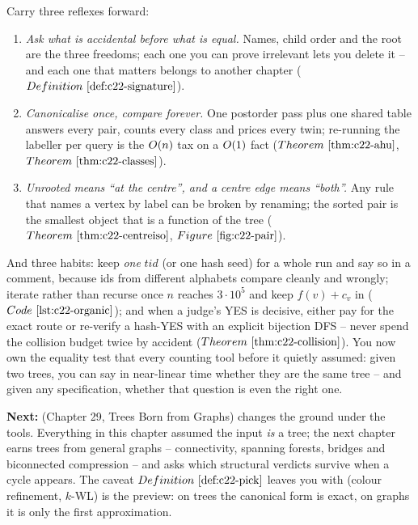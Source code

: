 \begin{lastword}
\medskip
Carry three reflexes forward:
\begin{enumerate}[nosep, leftmargin=1.6em]
  \item \emph{Ask what is accidental before what is equal.} Names, child order and the root
        are the three freedoms; each one you can prove irrelevant lets you delete it -- and
        each one that matters belongs to another chapter (\(\defref{c22-signature}\)).
  \item \emph{Canonicalise once, compare forever.} One postorder pass plus one shared table
        answers every pair, counts every class and prices every twin; re-running the
        labeller per query is the \(O(n)\) tax on a \(O(1)\) fact
        (\(\thmref{c22-ahu}\), \(\thmref{c22-classes}\)).
  \item \emph{Unrooted means ``at the centre'', and a centre edge means ``both''.} Any rule
        that names a vertex by label can be broken by renaming; the sorted pair is the
        smallest object that is a function of the tree (\(\thmref{c22-centreiso}\),
        \(\figref{c22-pair}\)).
\end{enumerate}

\medskip
And three habits: keep \emph{one} \(\mathit{tid}\) (or one hash seed) for a whole run and
say so in a comment, because ids from different alphabets compare cleanly and wrongly;
iterate rather than recurse once \(n\) reaches \(3\cdot10^5\) and keep
\(f(v)+c_v\) in  (\(\coderef{c22-organic}\)); and when a judge's YES is
decisive, either pay for the exact route or re-verify a hash-YES with an explicit bijection
DFS -- never spend the collision budget twice by accident (\(\thmref{c22-collision}\)). You
now own the equality test that every counting tool before it quietly assumed: given two
trees, you can say in near-linear time whether they are the same tree -- and given any
specification, whether that question is even the right one.

\medskip
\textbf{Next:}  (Chapter 29, Trees Born from Graphs) changes the ground under the
tools. Everything in this chapter assumed the input \emph{is} a tree; the next chapter earns
trees from general graphs -- connectivity, spanning forests, bridges and biconnected
compression -- and asks which structural verdicts survive when a cycle appears. The caveat
\(\defref{c22-pick}\) leaves you with (colour refinement, \(k\)-WL) is the preview: on trees
the canonical form is exact, on graphs it is only the first approximation.
\end{lastword}
